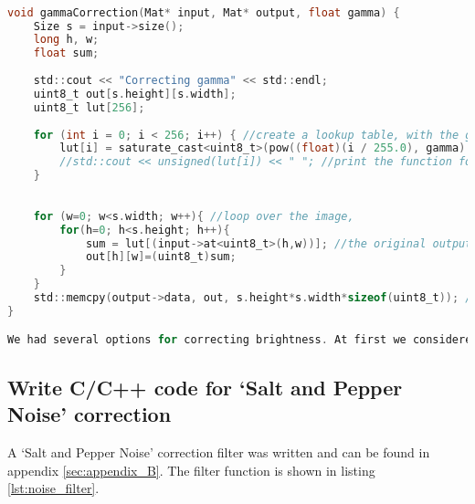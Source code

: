 \begin{lstlisting}[language=C, caption={Brightness correction}, label=lst:brightness_correction]

void gammaCorrection(Mat* input, Mat* output, float gamma) {
    Size s = input->size();
    long h, w;
    float sum;
    
    std::cout << "Correcting gamma" << std::endl;
    uint8_t out[s.height][s.width];
    uint8_t lut[256];	
    
    for (int i = 0; i < 256; i++) { //create a lookup table, with the gamma correction curve.
        lut[i] = saturate_cast<uint8_t>(pow((float)(i / 255.0), gamma) * 255.0f); //saturate cast negative values to 0, and higher values to 255 (uint8_t or unsigned char)
        //std::cout << unsigned(lut[i]) << " "; //print the function for testing. cout prints uint8_t as chars so we cast it.
    }
    
    
    for (w=0; w<s.width; w++){ //loop over the image, 
        for(h=0; h<s.height; h++){
            sum = lut[(input->at<uint8_t>(h,w))]; //the original output value will be scaled to the value in the LUT.
            out[h][w]=(uint8_t)sum;
        }
    }
    std::memcpy(output->data, out, s.height*s.width*sizeof(uint8_t)); //copy our standard 2D array to a new buffer that OpenCV understands
}

We had several options for correcting brightness. At first we considered simply increasing the value of each pixel by addition. However, this would significantly increase the brightness of the black background turning it dark grey. For this reason we settled on using a gamma correction curve instead. This would spread the histogram "bins" rather than moving them up. Determining the correct gamma correction constant was trial and error, exponents below 0,5 would make the object too bright. 

\end{lstlisting}

\subsection{Write C/C++ code for ‘Salt and Pepper Noise’ correction}

A ‘Salt and Pepper Noise’ correction filter was written and can be found in appendix \ref{sec:appendix_B}. The filter function is shown in listing \ref{lst:noise_filter}.

